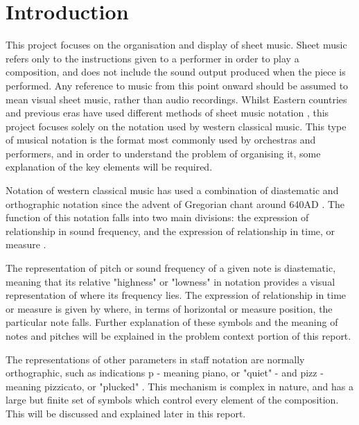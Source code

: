 \section{Introduction}
This project focuses on the organisation and display of sheet music. Sheet music refers only to the instructions given to a performer in order to play a composition, and does not include the sound output produced when the piece is performed. Any reference to music from this point onward should be assumed to mean visual sheet music, rather than audio recordings.
Whilst Eastern countries and previous eras have used different methods of sheet music notation \parencite{Kaufman}, this project focuses solely on the notation used by western classical music. This type of musical notation is the format most commonly used by orchestras and performers, and in order to understand the problem of organising it, some explanation of the key elements will be required.

Notation of western classical music has used a combination of diastematic and orthographic notation \parencite{RRastall} since the advent of Gregorian chant around 640AD \parencite{RTaruskin}. The function of this notation falls into two main divisions: the expression of relationship in sound frequency, and the expression of relationship in time, or measure \parencite{oxHistory}.

The representation of pitch or sound frequency of a given note is diastematic, meaning that its relative "highness" or "lowness" in notation provides a visual representation of where its frequency lies. The expression of relationship in time or measure is given by where, in terms of horizontal or measure position, the particular note falls. Further explanation of these symbols and the meaning of notes and pitches will be explained in the problem context portion of this report.

The representations of other parameters in staff notation are normally orthographic, such as indications p - meaning piano, or "quiet" - and pizz - meaning pizzicato, or "plucked" \parencite{RRastall}. This mechanism is complex in nature, and has a large but finite set of symbols which control every element of the composition. This will be discussed and explained later in this report.

